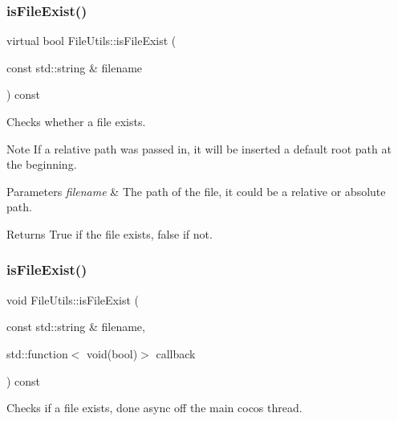 \subsubsection{\texorpdfstring{is\+File\+Exist()}{isFileExist()}\hspace{0.1cm}{\footnotesize\ttfamily [2/3]}}
{\footnotesize\ttfamily virtual bool File\+Utils\+::is\+File\+Exist (\begin{DoxyParamCaption}\item[{const std\+::string \&}]{filename }\end{DoxyParamCaption}) const\hspace{0.3cm}{\ttfamily [virtual]}}

Checks whether a file exists.

\begin{DoxyNote}{Note}
If a relative path was passed in, it will be inserted a default root path at the beginning. 
\end{DoxyNote}

\begin{DoxyParams}{Parameters}
{\em filename} & The path of the file, it could be a relative or absolute path. \\
\hline
\end{DoxyParams}
\begin{DoxyReturn}{Returns}
True if the file exists, false if not. 
\end{DoxyReturn}
\mbox{\label{classFileUtils_ad681db9f60c32e3aacbebacaf6a316a8}} 
\subsubsection{\texorpdfstring{is\+File\+Exist()}{isFileExist()}\hspace{0.1cm}{\footnotesize\ttfamily [3/3]}}
{\footnotesize\ttfamily void File\+Utils\+::is\+File\+Exist (\begin{DoxyParamCaption}\item[{const std\+::string \&}]{filename,  }\item[{std\+::function$<$ void(bool)$>$}]{callback }\end{DoxyParamCaption}) const\hspace{0.3cm}{\ttfamily [virtual]}}

Checks if a file exists, done async off the main cocos thread.

